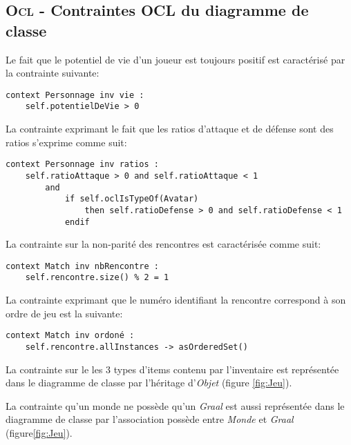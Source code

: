 
\subsection{\textsc{Ocl} - Contraintes OCL du diagramme de classe}
\label{sec:question-4}


Le fait que le potentiel de vie d'un joueur est toujours positif est caractérisé par la contrainte suivante:

\begin{lstlisting}[caption=Contrainte sur le potentiel de vie,captionpos=b,label={lst:vie},language=OCL]
context Personnage inv vie :
	self.potentielDeVie > 0
\end{lstlisting}

La contrainte exprimant le fait que les ratios d'attaque et de défense sont des ratios s'exprime comme suit:

\begin{lstlisting}[caption=Contrainte sur les ratios,captionpos=b,label={lst:ratios},language=OCL]
context Personnage inv ratios :
	self.ratioAttaque > 0 and self.ratioAttaque < 1
		and
			if self.oclIsTypeOf(Avatar)
				then self.ratioDefense > 0 and self.ratioDefense < 1
			endif
\end{lstlisting}

La contrainte sur la non-parité des rencontres est caractérisée comme suit:

\begin{lstlisting}[caption=Contrainte sur la non-parité des rencontres,captionpos=b,label={lst:impair},language=OCL]
context Match inv nbRencontre :
	self.rencontre.size() % 2 = 1
\end{lstlisting}

La contrainte exprimant que le numéro identifiant la rencontre correspond à son ordre de jeu est la suivante:

\begin{lstlisting}[caption=Contrainte sur l'ordre des rencontres,captionpos=b,label={lst:ordreRencontres},language=OCL]
context Match inv ordoné :
	self.rencontre.allInstances -> asOrderedSet()
\end{lstlisting}

La contrainte sur le les 3 types d'items contenu par l'inventaire est représentée dans le diagramme de classe par l'héritage d'\emph{Objet} (figure \ref{fig:Jeu}).

La contrainte qu'un monde ne possède qu'un \emph{Graal} est aussi représentée dans le diagramme de classe par l'association possède entre \emph{Monde} et \emph{Graal} (figure\ref{fig:Jeu}).

